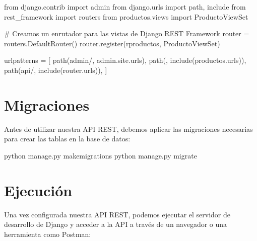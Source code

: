 \documentclass[
  a4paper,
  DIV=11,
  numbers=noendperiod,
  onepage,
  openany]{scrreprt}
\newenvironment{Shaded}{\begin{snugshade}}{\end{snugshade}}
\newcommand{\CommentTok}[1]{\textcolor[rgb]{0.37,0.37,0.37}{#1}}
\newcommand{\ExtensionTok}[1]{\textcolor[rgb]{0.00,0.23,0.31}{#1}}
\newcommand{\ImportTok}[1]{\textcolor[rgb]{0.00,0.46,0.62}{#1}}
\newcommand{\NormalTok}[1]{\textcolor[rgb]{0.00,0.23,0.31}{#1}}
\newcommand{\OperatorTok}[1]{\textcolor[rgb]{0.37,0.37,0.37}{#1}}
\newcommand{\StringTok}[1]{\textcolor[rgb]{0.13,0.47,0.30}{#1}}
\newcommand{\VerbatimStringTok}[1]{\textcolor[rgb]{0.13,0.47,0.30}{#1}}
\begin{document}
\begin{Shaded}
\begin{Highlighting}[]
\ImportTok{from}\NormalTok{ django.contrib }\ImportTok{import}\NormalTok{ admin}
\ImportTok{from}\NormalTok{ django.urls }\ImportTok{import}\NormalTok{ path, include}
\ImportTok{from}\NormalTok{ rest\_framework }\ImportTok{import}\NormalTok{ routers}
\ImportTok{from}\NormalTok{ productos.views }\ImportTok{import}\NormalTok{ ProductoViewSet}

\CommentTok{\# Creamos un enrutador para las vistas de Django REST Framework}
\NormalTok{router }\OperatorTok{=}\NormalTok{ routers.DefaultRouter()}
\NormalTok{router.register(}\VerbatimStringTok{r\textquotesingle{}productos\textquotesingle{}}\NormalTok{, ProductoViewSet)}

\NormalTok{urlpatterns }\OperatorTok{=}\NormalTok{ [}
\NormalTok{    path(}\StringTok{\textquotesingle{}admin/\textquotesingle{}}\NormalTok{, admin.site.urls),}
\NormalTok{    path(}\StringTok{\textquotesingle{}\textquotesingle{}}\NormalTok{, include(}\StringTok{\textquotesingle{}productos.urls\textquotesingle{}}\NormalTok{)),}
\NormalTok{    path(}\StringTok{\textquotesingle{}api/\textquotesingle{}}\NormalTok{, include(router.urls)),}
\NormalTok{]}
\end{Highlighting}
\end{Shaded}

\section{Migraciones}\label{migraciones}

Antes de utilizar nuestra API REST, debemos aplicar las migraciones
necesarias para crear las tablas en la base de datos:

\begin{Shaded}
\begin{Highlighting}[]
\ExtensionTok{python}\NormalTok{ manage.py makemigrations}
\ExtensionTok{python}\NormalTok{ manage.py migrate}
\end{Highlighting}
\end{Shaded}

\section{Ejecución}\label{ejecuciuxf3n-1}

Una vez configurada nuestra API REST, podemos ejecutar el servidor de
desarrollo de Django y acceder a la API a través de un navegador o una
herramienta como Postman:
\end{document}

